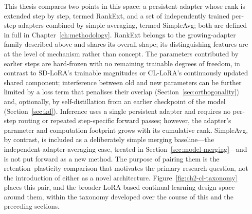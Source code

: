 This thesis compares two points in this space: a persistent adapter whose
rank is extended step by step, termed RankExt, and a set of independently
trained per-step adapters combined by simple averaging, termed SimpleAvg;
both are defined in full in Chapter~\ref{ch:methodology}. RankExt belongs to the
growing-adapter family described above and shares its overall shape; its
distinguishing features are at the level of mechanism rather than concept.
The parameters contributed by earlier steps are hard-frozen with no
remaining trainable degrees of freedom, in contrast to SD-LoRA's trainable
magnitudes or CL-LoRA's continuously updated shared component; interference
between old and new parameters can be further limited by a loss term that
penalises their overlap (Section~\ref{sec:orthogonality}) and, optionally, by self-distillation
from an earlier checkpoint of the model (Section~\ref{sec:kd}). Inference
uses a single persistent adapter and requires no per-step routing or
repeated step-specific forward passes; however, the adapter's parameter and
computation footprint grows with its cumulative rank. SimpleAvg,
by contrast, is included as a deliberately simple merging baseline---the
independent-adapter-averaging case, treated in Section~\ref{sec:model-merging}---and is not put
forward as a new method. The purpose of pairing them is the
retention--plasticity comparison that motivates the primary research
question, not the introduction of either as a novel architecture.
Figure~\ref{fig:ch2-cl-taxonomy} places this pair, and the broader
LoRA-based continual-learning design space around them, within the
taxonomy developed over the course of this and the preceding sections.


